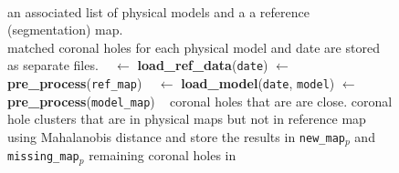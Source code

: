 \begin{figure}[t!]
        \begin{algorithmic}[1]
                \\
                \Statex \hspace{1.6cm} an associated list of physical models and a 
                \Statex \hspace{1.6cm} a reference (segmentation) map.\\
                \Statex \hspace{1.6cm} matched coronal holes for each physical model
                \Statex \hspace{1.6cm} and date are stored as separate files.
                \Statex
                \State~
                \State {}
                 $\gets$ {\bf load\_ref\_data}({\tt date})
                 $\gets$ {\bf pre\_process}({\tt ref\_map})\label{alg:ov_preprocessing1}
                \Statex
                \State~
                 $\gets$ {\bf load\_model}({\tt date}, {\tt model})
                \Statex \hspace{3.7cm}$\gets$ {\bf pre\_process}({\tt model\_map})\label{alg:ov_preprocessing2}
                \Statex
                \State~
                 coronal holes that are are close.
                  coronal hole clusters that are in
                \Statex \hspace{2.9cm} physical maps but not in reference
                \Statex \hspace{2.9cm} map using Mahalanobis distance
                \Statex \hspace{2.9cm}  and store the results in
                \Statex \hspace{2.9cm} {\tt new\_map$_p$} and {\tt missing\_map$_p$}
                 remaining coronal holes in 

\end{algorithmic}
\end{figure}
